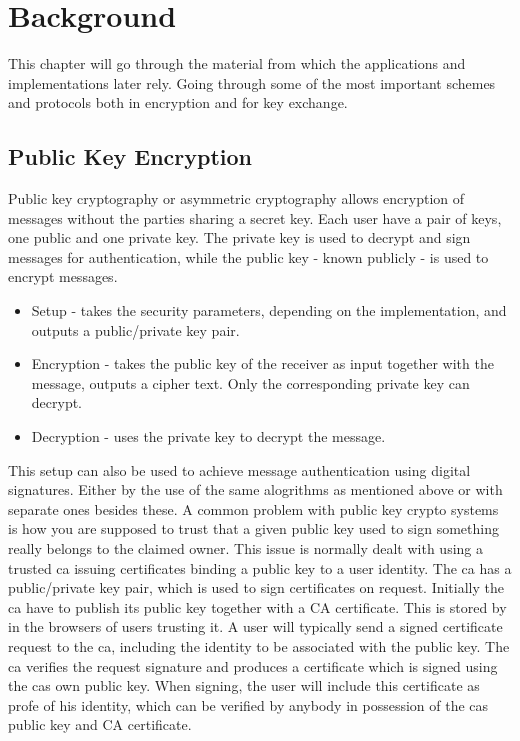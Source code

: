 \chapter{Background}
\label{chp:background} 
This chapter will go through the material from which the applications and implementations later rely. Going through some of the most important schemes and protocols both in encryption and for key exchange.

\section{Public Key Encryption}\label{sec:pke}
Public key cryptography or asymmetric cryptography allows encryption of messages without the parties sharing a secret key. Each user have a pair of keys, one public and one private key. The private key is used to decrypt and sign messages for authentication, while the public key - known publicly - is used to encrypt messages. 
\begin{itemize}
\item Setup - takes the security parameters, depending on the implementation, and outputs a public/private key pair.
\item Encryption - takes the public key of the receiver as input together with the message, outputs a cipher text. Only the corresponding private key can decrypt.
\item Decryption - uses the private key to decrypt the message.
\end{itemize}

This setup can also be used to achieve message authentication using digital signatures. Either by the use of the same alogrithms as mentioned above or with separate ones besides these. A common problem with public key crypto systems is how you are supposed to trust that a given public key used to sign something really belongs to the claimed owner. This issue is normally dealt with using a trusted \gls{ca} issuing certificates binding a public key to a user identity. The \gls{ca} has a public/private key pair, which is used to sign certificates on request. Initially the \gls{ca} have to publish its public key together with a CA certificate. This is stored by in the browsers of users trusting it. A user will typically send a signed certificate request to the \gls{ca}, including the identity to be associated with the public key. The \gls{ca} verifies the request signature and produces a certificate which is signed using the \glspl{ca} own public key. When signing, the user will include this certificate as profe of his identity, which can be verified by anybody in possession of the \glspl{ca} public key and CA certificate. 



